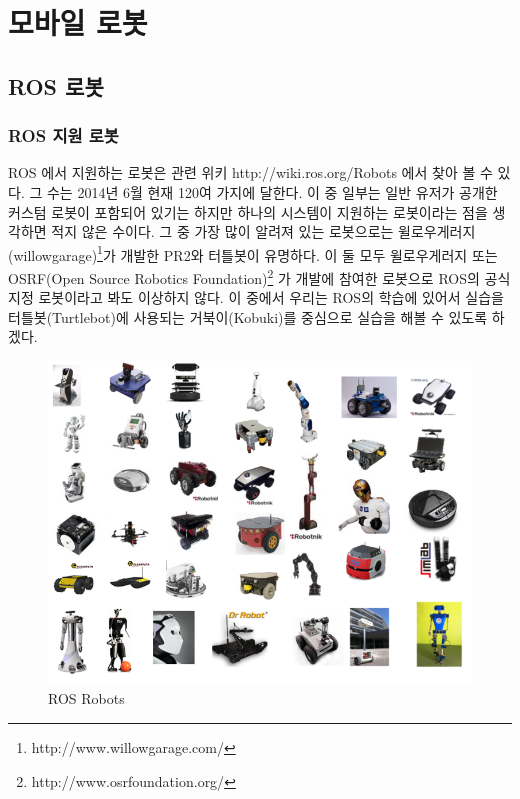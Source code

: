 
\chapter{모바일 로봇}

\section{ROS 로봇}

\subsection{ROS 지원 로봇}

ROS 에서 지원하는 로봇은 관련 위키 http://wiki.ros.org/Robots 에서 찾아 볼 수 있다. 그 수는 2014년 6월 현재 120여 가지에 달한다. 이 중 일부는 일반 유저가 공개한 커스텀 로봇이 포함되어 있기는 하지만 하나의 시스템이 지원하는 로봇이라는 점을 생각하면 적지 않은 수이다. 그 중 가장 많이 알려져 있는 로봇으로는 윌로우게러지(willowgarage)\footnote{http://www.willowgarage.com/}가 개발한 PR2와 터틀봇이 유명하다. 이 둘 모두 윌로우게러지 또는 OSRF(Open Source Robotics Foundation)\footnote{http://www.osrfoundation.org/} 가 개발에 참여한 로봇으로 ROS의 공식 지정 로봇이라고 봐도 이상하지 않다. 이 중에서 우리는 ROS의 학습에 있어서 실습을 터틀봇(Turtlebot)에 사용되는 거북이(Kobuki)를 중심으로 실습을 해볼 수 있도록 하겠다.

\begin{figure}[h]
\centering\includegraphics[width=\columnwidth]{pictures/chapter10/robots.png}
\caption{ROS Robots}
\end{figure}

